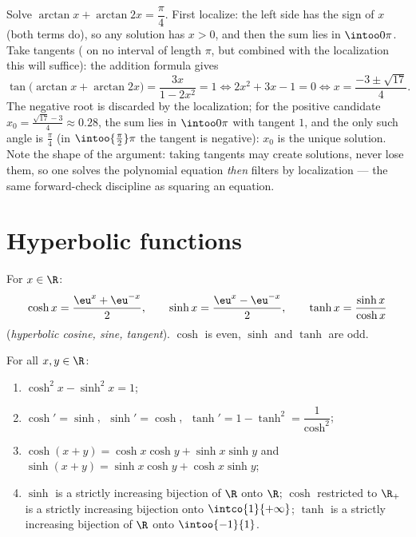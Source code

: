 \begin{example}\label{ex:b1:functions:arctaneq}
Solve $\arctan x + \arctan 2x = \dfrac\pi4$. First localize: the
left side has the sign of $x$ (both terms do), so any solution has
$x > 0$, and then the sum lies in $\intoo0\pi$. Take tangents
( on no interval of length $\pi$, but combined with the
localization this will suffice): the addition formula gives
\[
\tan\bigl(\arctan x + \arctan 2x\bigr)
= \frac{3x}{1 - 2x^2} = 1
\iff 2x^2 + 3x - 1 = 0
\iff x = \frac{-3 \pm \sqrt{17}}4 .
\]
The negative root is discarded by the localization; for the
positive candidate $x_0 = \frac{\sqrt{17} - 3}4 \approx 0.28$,
the sum lies in $\intoo0\pi$ with tangent $1$, and the only such
angle is $\frac\pi4$ (in $\intoo{\frac\pi2}\pi$ the tangent is
negative): $x_0$ is the unique solution. Note the shape of the
argument: taking tangents may create solutions, never lose them,
so one solves the polynomial equation \emph{then} filters by
localization --- the same forward-check discipline as squaring
an equation.
\end{example}

\section{Hyperbolic functions}

\begin{definition}[$\cosh$, $\sinh$, $\tanh$]\label{def:b1:functions:hyperbolic}
For $x \in \R$:
\[
\cosh x = \frac{\eu^x + \eu^{-x}}{2},
\qquad
\sinh x = \frac{\eu^x - \eu^{-x}}{2},
\qquad
\tanh x = \frac{\sinh x}{\cosh x}
\]
(\emph{hyperbolic cosine, sine, tangent}). $\cosh$ is even, $\sinh$ and $\tanh$ are odd.
\end{definition}

\begin{proposition}\label{prop:b1:functions:hyprules}
For all $x, y \in \R$:
\begin{enumerate}
  \item $\cosh^2 x - \sinh^2 x = 1$;
  \item $\cosh' = \sinh$, $\;\sinh' = \cosh$, $\;\tanh' = 1 - \tanh^2
        = \dfrac{1}{\cosh^2}$;
  \item $\cosh(x+y) = \cosh x\cosh y + \sinh x \sinh y$ and
        $\sinh(x+y) = \sinh x \cosh y + \cosh x \sinh y$;
  \item $\sinh$ is a strictly increasing bijection of $\R$ onto $\R$;
        $\cosh$ restricted to $\R_+$ is a strictly increasing
        bijection onto $\intco{1}{+\infty}$; $\tanh$ is a strictly
        increasing bijection of $\R$ onto $\intoo{-1}{1}$.
\end{enumerate}
\end{proposition}

